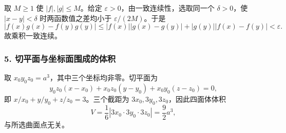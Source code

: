 \documentclass[11pt,fontset=fandol]{ctexart}
\begin{document}
取 \(M\geq1\) 使 \(|f|,|g|\leq M\)。给定
\(\varepsilon>0\)，由一致连续性，选取同一个 \(\delta>0\)，使
\(|x-y|<\delta\) 时两函数值之差均小于 \(\varepsilon/(2M)\)。于是 \[
|f(x)g(x)-f(y)g(y)|
\leq|f(x)||g(x)-g(y)|+|g(y)||f(x)-f(y)|<\varepsilon.
\] 故乘积一致连续。

\subsubsection{5.
切平面与坐标面围成的体积}\label{ux5207ux5e73ux9762ux4e0eux5750ux6807ux9762ux56f4ux6210ux7684ux4f53ux79ef}

取 \(x_0y_0z_0=a^3\)，其中三个坐标均非零。切平面为 \[
y_0z_0(x-x_0)+x_0z_0(y-y_0)+x_0y_0(z-z_0)=0,
\] 即 \(x/x_0+y/y_0+z/z_0=3\)。三个截距为
\(3x_0,3y_0,3z_0\)，因此四面体体积 \[
\boxed{V=\frac16|3x_0\cdot3y_0\cdot3z_0|=\frac92a^3,}
\] 与所选曲面点无关。
\end{document}
